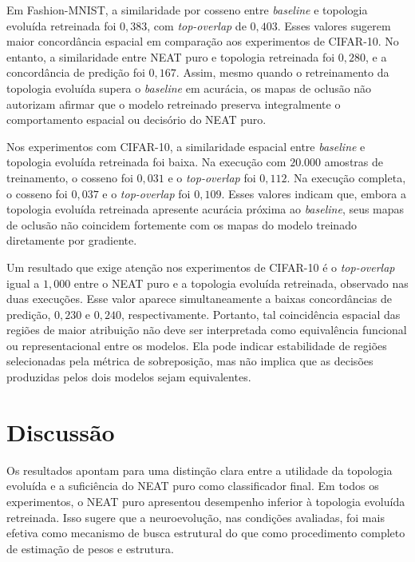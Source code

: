 Em Fashion-MNIST, a similaridade por cosseno entre \textit{baseline} e topologia evoluída retreinada foi $0{,}383$, com \textit{top-overlap} de $0{,}403$. Esses valores sugerem maior concordância espacial em comparação aos experimentos de CIFAR-10. No entanto, a similaridade entre NEAT puro e topologia retreinada foi $0{,}280$, e a concordância de predição foi $0{,}167$. Assim, mesmo quando o retreinamento da topologia evoluída supera o \textit{baseline} em acurácia, os mapas de oclusão não autorizam afirmar que o modelo retreinado preserva integralmente o comportamento espacial ou decisório do NEAT puro.

Nos experimentos com CIFAR-10, a similaridade espacial entre \textit{baseline} e topologia evoluída retreinada foi baixa. Na execução com $20.000$ amostras de treinamento, o cosseno foi $0{,}031$ e o \textit{top-overlap} foi $0{,}112$. Na execução completa, o cosseno foi $0{,}037$ e o \textit{top-overlap} foi $0{,}109$. Esses valores indicam que, embora a topologia evoluída retreinada apresente acurácia próxima ao \textit{baseline}, seus mapas de oclusão não coincidem fortemente com os mapas do modelo treinado diretamente por gradiente.

Um resultado que exige atenção nos experimentos de CIFAR-10 é o \textit{top-overlap} igual a $1{,}000$ entre o NEAT puro e a topologia evoluída retreinada, observado nas duas execuções. Esse valor aparece simultaneamente a baixas concordâncias de predição, $0{,}230$ e $0{,}240$, respectivamente. Portanto, tal coincidência espacial das regiões de maior atribuição não deve ser interpretada como equivalência funcional ou representacional entre os modelos. Ela pode indicar estabilidade de regiões selecionadas pela métrica de sobreposição, mas não implica que as decisões produzidas pelos dois modelos sejam equivalentes.

\section{Discussão}
\label{sec:discussao}

Os resultados apontam para uma distinção clara entre a utilidade da topologia evoluída e a suficiência do NEAT puro como classificador final. Em todos os experimentos, o NEAT puro apresentou desempenho inferior à topologia evoluída retreinada. Isso sugere que a neuroevolução, nas condições avaliadas, foi mais efetiva como mecanismo de busca estrutural do que como procedimento completo de estimação de pesos e estrutura.

